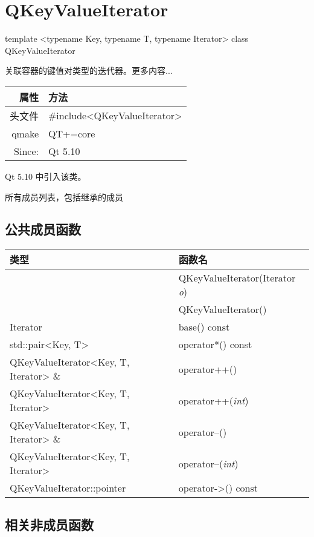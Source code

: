 \chapter{QKeyValueIterator}


template <typename Key, typename T, typename Iterator> class QKeyValueIterator

关联容器的键值对类型的迭代器。更多内容...

\begin{tabular}{|r|l|}
	\hline
	属性 & 方法 \\
	\hline
	头文件 & \#include<QKeyValueIterator>\\      
	\hline
	qmake & QT+=core\\      
	\hline
	Since:&	Qt 5.10 \\ 
	\hline
\end{tabular}

Qt 5.10 中引入该类。

\begin{compactitem}
\item 所有成员列表，包括继承的成员
\end{compactitem}

\section{公共成员函数}

\begin{tabular}{|l|l|}
\hline
类型 &	函数名\\
\hline
& QKeyValueIterator(Iterator \emph{o}) \\ 
\hline
& QKeyValueIterator() \\ 
\hline
Iterator	& base() const \\ 
\hline
std::pair<Key, T>	& operator*() const \\ 
\hline
QKeyValueIterator<Key, T, Iterator> \&	& operator++() \\ 
\hline
QKeyValueIterator<Key, T, Iterator>	& operator++(\emph{int}) \\ 
\hline
QKeyValueIterator<Key, T, Iterator> \& &	operator--() \\ 
\hline
QKeyValueIterator<Key, T, Iterator>	 &operator--(\emph{int}) \\ 
\hline
QKeyValueIterator::pointer &	operator->() const \\ 
\hline
\end{tabular}

\section{相关非成员函数}

